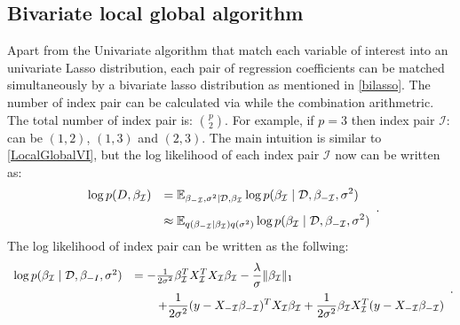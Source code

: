 \newpage
\subsection{Bivariate local global algorithm}
Apart from the Univariate algorithm that match each variable of interest into an univariate Lasso distribution, each pair of regression coefficients can be matched simultaneously by a bivariate lasso distribution as mentioned in \autoref{bilasso}.
The number of index pair can be calculated via while the combination arithmetric. The total number of index pair is: ${p}\choose{2}$. For example, if $p=3$ then index pair $\mathcal{I}$: can be $(1,2)$, $(1,3)$ and $(2,3)$.
The main intuition is similar to \autoref{LocalGlobalVI}, but
the log likelihood of each index pair $\mathcal{I}$ now can be written as:
\begin{equation}
	\begin{array}{rl} 
		\log p(D,\beta_{\mathcal I}) 
		& \displaystyle = \mathbb{E}_{\beta_{-{\mathcal I}},\sigma^2\mid \mathcal{D},\beta_{\mathcal I}} \log p(\beta_{\mathcal I}\mid \mathcal{D},\beta_{-{\mathcal I}},\sigma^2)
		\\ [2ex]
		& \displaystyle \approx  \mathbb{E}_{q(\beta_{-{\mathcal I}}\mid\beta_{\mathcal I})q(\sigma^2)} \log p(\beta_{\mathcal I}\mid \mathcal{D},\beta_{-{\mathcal I}},\sigma^2)\\
		
	\end{array}.
\end{equation}
The log likelihood of index pair can be written as the follwing:
\begin{equation}
	\begin{array}{rl}
		\log p(\beta_{\mathcal I}\mid\mathcal{D},\beta_{-I},\sigma^2) 
		& \displaystyle = - \tfrac{1}{2\sigma^2}\beta_{\mathcal I}^TX_{\mathcal I}^TX_{\mathcal I}\beta_{\mathcal I} - \frac{\lambda}{\sigma} \|\beta_{{\mathcal I}} \|_1
		\\ [2ex]
		& \displaystyle \qquad 
		+ \frac{1}{2\sigma^2}(y - X_{-{\mathcal I}}\beta_{-{\mathcal I}})^TX_{\mathcal I}\beta_{{\mathcal I}}
		+ \frac{1}{2\sigma^2}\beta_{{\mathcal I}}X_{\mathcal I}^T(y - X_{-{\mathcal I}}\beta_{-{\mathcal I}})
		
	\end{array}.
\end{equation}


